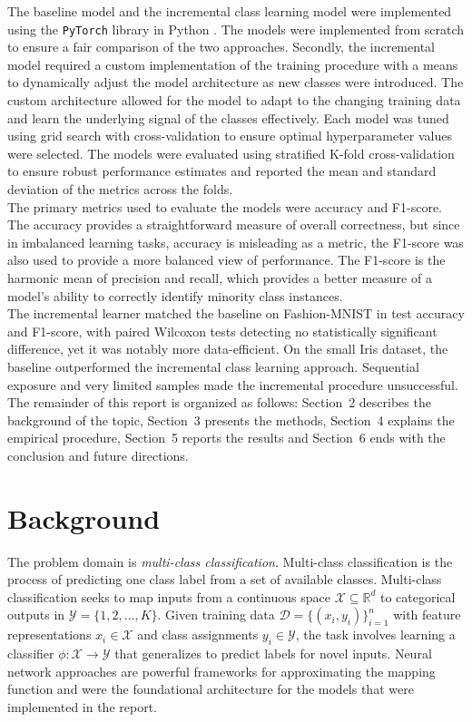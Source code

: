 \documentclass[conference]{IEEEtran}
\begin{document}
The baseline model and the incremental class learning model were implemented using the \texttt{PyTorch} library in Python \cite{paszke2019pytorch}. The models were implemented from scratch to ensure a fair 
comparison of the two approaches. Secondly, the incremental model required a custom implementation of the training procedure with a means to 
dynamically adjust the model architecture as new classes were introduced. The custom architecture allowed for the model to adapt to the changing training data and learn the underlying signal of the classes effectively. Each model was tuned using grid search with cross-validation to ensure optimal hyperparameter values were selected. The models were evaluated using stratified K-fold cross-validation to ensure robust performance estimates and reported the mean and standard deviation of the metrics across the folds.\\

The primary metrics used to evaluate the models were accuracy and F1-score. The accuracy provides a straightforward measure of overall correctness, but since in imbalanced learning tasks, 
accuracy is misleading as a metric, the F1-score was also used to provide a more balanced view of performance. The F1-score is the harmonic mean of precision and recall, which provides a better 
measure of a model's ability to correctly identify minority class instances.\\

The incremental learner matched the baseline on Fashion-MNIST in test accuracy and F1-score, with paired Wilcoxon tests 
detecting no statistically significant difference, yet it was notably more data-efficient. On the small Iris dataset, the baseline outperformed the 
incremental class learning approach. Sequential exposure and very limited samples made the incremental procedure unsuccessful.\\

The remainder of this report is organized as follows: Section~2 describes the background of the topic, 
Section~3 presents the methods, Section~4 explains the empirical procedure, Section~5 reports the results and Section~6 ends with the conclusion and future directions.

\section{Background}
The problem domain is \textit{multi-class classification}. Multi-class classification is the process of predicting one class label from a set of available classes.
Multi-class classification seeks to map inputs from a continuous space \(\mathcal{X} \subseteq \mathbb{R}^d\) 
to categorical outputs in \(\mathcal{Y} = \{1,2,\dots,K\}\). 
Given training data \(\mathcal{D} = \{(x_i, y_i)\}_{i=1}^n\) 
with feature representations \(x_i \in \mathcal{X}\) 
and class assignments \(y_i \in \mathcal{Y}\), 
the task involves learning a classifier 
\(\phi: \mathcal{X} \to \mathcal{Y}\) 
that generalizes to predict labels for novel inputs. Neural network approaches are powerful frameworks for approximating the mapping function and were the foundational architecture for the 
models that were implemented in the report.\\
\end{document}
